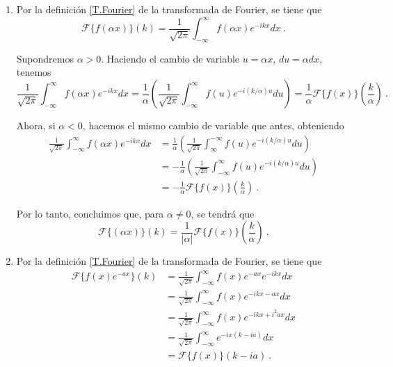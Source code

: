 \begin{demo}
\begin{enumerate}
    \item Por la definición \eqref{T.Fourier} de la transformada de Fourier, se tiene que
    \begin{equation*}
        \mathcal{F} \{ f(\alpha x) \}(k) = \frac{1}{\sqrt{2\pi}} \int_{-\infty}^\infty f(\alpha x)e^{-ikx} dx \ .
    \end{equation*}

    Supondremos $\alpha > 0$. Haciendo el cambio de variable $u = \alpha x$, $du = \alpha dx$, tenemos
    \begin{equation*}
        \frac{1}{\sqrt{2\pi}} \int_{-\infty}^\infty f(\alpha x) e^{-ikx} dx = \frac{1}{\alpha} \left(\frac{1}{\sqrt{2\pi}} \int_{-\infty}^\infty f(u) e^{-i(k/\alpha)u} du \right) = \frac{1}{\alpha} \mathcal{F}\{f(x)\} \left( \frac{k}{\alpha} \right) \ .
    \end{equation*}

    Ahora, si $\alpha < 0$, hacemos el mismo cambio de variable que antes, obteniendo
    \begin{align*}
        \frac{1}{\sqrt{2\pi}} \int_{-\infty}^\infty f(\alpha x)e^{-ikx} dx & = \frac{1}{\alpha} \left( \frac{1}{\sqrt{2\pi}} \int_{\infty}^{-\infty} f(u) e^{-i(k/\alpha)u} du \right) \\ 
        & = - \frac{1}{\alpha} \left(\frac{1}{\sqrt{2\pi}} \int_{-\infty}^\infty f(u) e^{-i(k/\alpha)u} du \right) \\
        & = - \frac{1}{\alpha} \mathcal{F}\{f(x)\} \left(\frac{k}{\alpha}\right) \ .
    \end{align*}

    Por lo tanto, concluimos que, para $\alpha \neq 0$, se tendrá que
    \begin{equation*}
        \mathcal{F}\{(\alpha x)\}(k) = \frac{1}{|\alpha|} \mathcal{F}\{f(x)\} \left( \frac{k}{\alpha} \right) \ .
    \end{equation*}

    \item Por la definición \eqref{T.Fourier} de la transformada de Fourier, se tiene que
    \begin{align*}
        \mathcal{F}\{ f(x)e^{-ax} \}(k) & = \frac{1}{\sqrt{2\pi}} \int_{-\infty}^\infty f(x) e^{-ax} e^{-ikx} dx \\
        & = \frac{1}{\sqrt{2\pi}} \int_{-\infty}^\infty f(x) e^{-ikx-ax} dx \\
        & = \frac{1}{\sqrt{2\pi}} \int_{-\infty}^\infty f(x) e^{-ikx+i^2ax} dx \\
        & = \frac{1}{\sqrt{2\pi}} \int_{-\infty}^\infty e^{-ix(k-ia)} dx \\
        & = \mathcal{F}\{f(x)\}(k-ia) \ .
    \end{align*}
\end{enumerate}
\end{demo}

